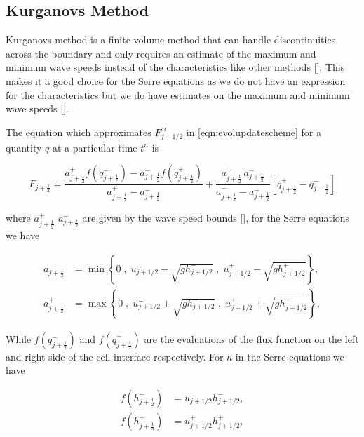 \subsection{Kurganovs Method}

Kurganovs method is a finite volume method that can handle discontinuities across the boundary and only requires an estimate of the maximum and minimum wave speeds instead of the characteristics like other methods []. This makes it a good choice for the Serre equations as we do not have an expression for the characteristics but we do have estimates on the maximum and minimum wave speeds []. 

The equation which approximates $F^{\,n} _{j+1/2}$ in \eqref{eqn:evolupdatescheme} for a quantity $q$ at a particular time $t^n$ is

\begin{equation}\label{eqn:HLL_flux}
F_{j+\frac{1}{2}} = \dfrac{a^+_{j+\frac{1}{2}} f\left(q^-_{j+\frac{1}{2}}\right) - a^-_{j+\frac{1}{2}} f\left(q^+_{j+\frac{1}{2}}\right)}{a^+_{j+\frac{1}{2}} - a^-_{j+\frac{1}{2}}}  + \dfrac{a^+_{j+\frac{1}{2}} \, a^-_{j+\frac{1}{2}}}{a^+_{j+\frac{1}{2}} - a^-_{j+\frac{1}{2}}} \left [ q^+_{j+\frac{1}{2}} - q^-_{j+\frac{1}{2}} \right ]
\end{equation}

where $a^+_{j+\frac{1}{2}}$ $a^-_{j+\frac{1}{2}}$ are given by the wave speed bounds [], for the Serre equations we have

\begin{align*}
a^-_{j+\frac{1}{2}} &= \min\left\lbrace 0\;,\;  u^-_{j + 1/2} - \sqrt{g h^-_{j + 1/2}}  \;,\;u^+_{j + 1/2} - \sqrt{g h^+_{j + 1/2}} \right\rbrace  ,\\
a^+_{j+\frac{1}{2}} &= \max\left\lbrace 0 \;,\;  u^-_{j + 1/2} + \sqrt{g h^-_{j + 1/2}}  \;,\;u^+_{j + 1/2} + \sqrt{g h^+_{j + 1/2}} \right\rbrace  ,
\end{align*}

While $f(q^-_{j+\frac{1}{2}})$ and $f(q^+_{j+\frac{1}{2}})$ are the evaluations of the flux function on the left and right side of the cell interface respectively. For $h$ in the Serre equations we have

\begin{align*}
f\left(h^-_{j+\frac{1}{2}}\right) &= u^-_{j + 1/2}  h^-_{j + 1/2}   ,\\
f\left(h^+_{j+\frac{1}{2}}\right) &= u^+_{j + 1/2}  h^+_{j + 1/2}  ,
\end{align*}

